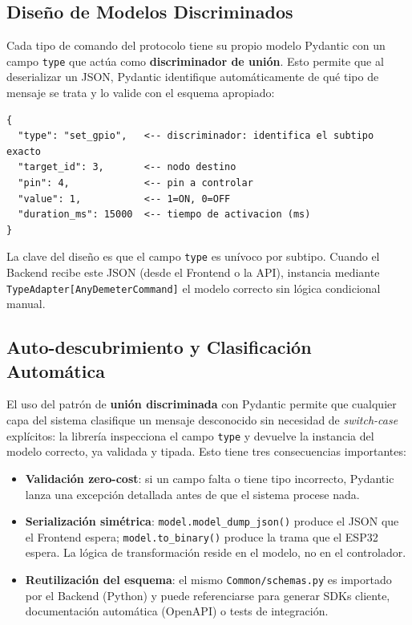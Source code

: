 \subsection{Diseño de Modelos Discriminados}

Cada tipo de comando del protocolo tiene su propio modelo Pydantic con un campo
\texttt{type} que actúa como \textbf{discriminador de unión}. Esto permite que al
deserializar un JSON, Pydantic identifique automáticamente de qué tipo de mensaje
se trata y lo valide con el esquema apropiado:

\begin{lstlisting}[style=trama, caption={Estructura conceptual de un modelo discriminado}]
{
  "type": "set_gpio",   <-- discriminador: identifica el subtipo exacto
  "target_id": 3,       <-- nodo destino
  "pin": 4,             <-- pin a controlar
  "value": 1,           <-- 1=ON, 0=OFF
  "duration_ms": 15000  <-- tiempo de activacion (ms)
}
\end{lstlisting}

La clave del diseño es que el campo \texttt{type} es unívoco por subtipo. Cuando el
Backend recibe este JSON (desde el Frontend o la API), instancia mediante
\texttt{TypeAdapter[AnyDemeterCommand]} el modelo correcto sin lógica condicional manual.

\subsection{Auto-descubrimiento y Clasificación Automática}

El uso del patrón de \textbf{unión discriminada} con Pydantic permite que cualquier capa
del sistema clasifique un mensaje desconocido sin necesidad de \textit{switch-case} explícitos:
la librería inspecciona el campo \texttt{type} y devuelve la instancia del modelo correcto,
ya validada y tipada. Esto tiene tres consecuencias importantes:

\begin{itemize}[leftmargin=*, label=--]
    \item \textbf{Validación zero-cost}: si un campo falta o tiene tipo incorrecto,
          Pydantic lanza una excepción detallada antes de que el sistema procese nada.
    \item \textbf{Serialización simétrica}: \texttt{model.model\_dump\_json()} produce el
          JSON que el Frontend espera; \texttt{model.to\_binary()} produce la trama que
          el ESP32 espera. La lógica de transformación reside en el modelo, no en el
          controlador.
    \item \textbf{Reutilización del esquema}: el mismo \texttt{Common/schemas.py} es
          importado por el Backend (Python) y puede referenciarse para generar SDKs cliente,
          documentación automática (OpenAPI) o tests de integración.
\end{itemize}

